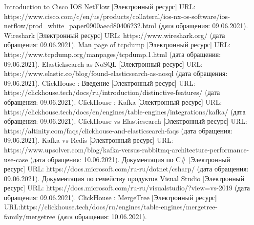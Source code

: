 \clearpage
\begin{thebibliography}{9}
	 Introduction to Cisco IOS NetFlow [Электронный ресурс] URL: https://www.cisco.com/c/en/us/products/collateral/ios-nx-os-software/ios-netflow/prod\_white\_paper0900aecd80406232.html (дата обращения: 09.06.2021).
	 Wireshark [Электронный ресурс] URL: https://www.wireshark.org/ (дата обращения: 09.06.2021).
	 Man page of tcpdump [Электронный ресурс] URL: https://www.tcpdump.org/manpages/tcpdump.1.html (дата обращения: 09.06.2021).
	 Elasticksearch as NoSQL [Электронный ресурс] URL:  https://www.elastic.co/blog/found-elasticsearch-as-nosql (дата обращения: 09.06.2021).
	 ClickHouse : Введение [Электронный ресурс] URL: https://clickhouse.tech/docs/ru/introduction/distinctive-features/ (дата обращения: 09.06.2021).
	 ClickHouse : Kafka [Электронный ресурс] URL: https://clickhouse.tech/docs/en/engines/table-engines/integrations/kafka/ (дата обращения: 09.06.2021).
	 ClickHouse vs Elasticsearch [Электронный ресурс] URL: https://altinity.com/faqs/clickhouse-and-elasticsearch-faqs (дата обращения: 09.06.2021).
	 Kafka vs Redis [Электронный ресурс] URL: https://www.upsolver.com/blog/kafka-versus-rabbitmq-architecture-performance-use-case (дата обращения: 10.06.2021).
	 Документация по C\# [Электронный ресурс] URL: https://docs.microsoft.com/ru-ru/dotnet/csharp/ (дата обращения: 09.06.2021).
	 Документация по семейству продуктов Visual Studio [Электронный ресурс] URL: https://docs.microsoft.com/ru-ru/visualstudio/?view=vs-2019 (дата обращения: 09.06.2021).
	 ClickHouse : MergeTree [Электронный ресурс] URL:https://clickhouse.tech/docs/ru/engines/table-engines/mergetree-family/mergetree (дата обращения: 10.06.2021).
\end{thebibliography}

